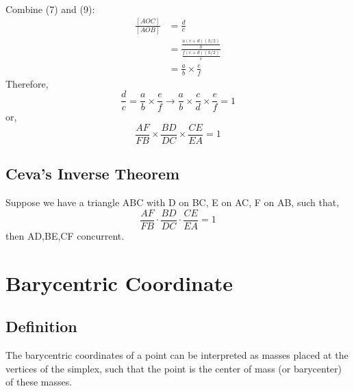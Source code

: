 \documentclass{article}
\begin{document}
\\
Combine (7) and (9):\\
\begin{align*}
    \frac{[AOC]}{[AOB]}&=\frac{d}{c}\\
    &=\frac{\frac{a(c+d)(h/2)}{b}}{\frac{f(c+d)(h/2)}{e}}\\
    &=\frac{a}{b}\times\frac{e}{f}
\end{align*}
Therefore,
$$\frac{d}{c}=\frac{a}{b}\times\frac{e}{f}\longrightarrow\frac{a}{b}\times\frac{c}{d}\times\frac{e}{f}=1$$
or,
$$\frac{AF}{FB}\times \frac{BD}{DC} \times \frac{CE}{EA}=1$$
\vspace{200px}

\subsection{Ceva's Inverse Theorem}

Suppose we have a triangle ABC with D on BC, E on AC, F on AB, such that,
$$\frac{AF}{FB}\cdot \frac{BD}{DC} \cdot \frac{CE}{EA}=1$$
then AD,BE,CF concurrent.

\section{Barycentric Coordinate}
\subsection{Definition}
The barycentric coordinates of a point can be interpreted as masses placed at the vertices of the simplex, such that the point is the center of mass (or barycenter) of these masses.



\end{document}
